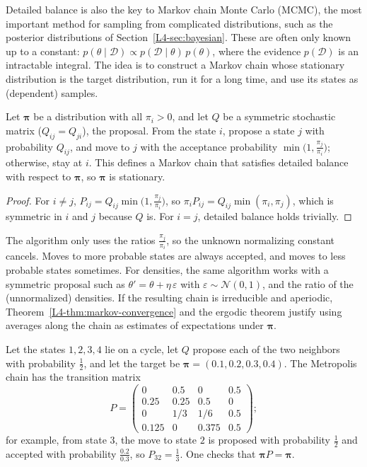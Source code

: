 Detailed balance is also the key to Markov chain Monte Carlo (MCMC), the most important method for sampling from complicated distributions, such as the posterior distributions of Section~\ref{L4-sec:bayesian}. These are often only known up to a constant: $p(\theta \mid \mathcal{D}) \propto p(\mathcal{D} \mid \theta)\,p(\theta)$, where the evidence $p(\mathcal{D})$ is an intractable integral. The idea is to construct a Markov chain whose stationary distribution is the target distribution, run it for a long time, and use its states as (dependent) samples.

\begin{theorem}\label{L4-thm:metropolis}
    Let $\boldsymbol{\pi}$ be a distribution with all $\pi_i > 0$, and let $Q$ be a symmetric stochastic matrix ($Q_{ij} = Q_{ji}$), the proposal. From the state $i$, propose a state $j$ with probability $Q_{ij}$, and move to $j$ with the acceptance probability $\min\big(1, \frac{\pi_j}{\pi_i}\big)$; otherwise, stay at $i$. This defines a Markov chain that satisfies detailed balance with respect to $\boldsymbol{\pi}$, so $\boldsymbol{\pi}$ is stationary.
\end{theorem}

\begin{proof}
    For $i \neq j$, $P_{ij} = Q_{ij}\min\big(1, \frac{\pi_j}{\pi_i}\big)$, so $\pi_i P_{ij} = Q_{ij}\min(\pi_i, \pi_j)$, which is symmetric in $i$ and $j$ because $Q$ is. For $i = j$, detailed balance holds trivially.
\end{proof}

The algorithm only uses the ratios $\frac{\pi_j}{\pi_i}$, so the unknown normalizing constant cancels. Moves to more probable states are always accepted, and moves to less probable states sometimes. For densities, the same algorithm works with a symmetric proposal such as $\theta' = \theta + \eta\,\varepsilon$ with $\varepsilon \sim \mathcal{N}(0, 1)$, and the ratio of the (unnormalized) densities. If the resulting chain is irreducible and aperiodic, Theorem~\ref{L4-thm:markov-convergence} and the ergodic theorem justify using averages along the chain as estimates of expectations under $\boldsymbol{\pi}$.

\begin{example}\label{L4-ex:metropolis}
    Let the states $1, 2, 3, 4$ lie on a cycle, let $Q$ propose each of the two neighbors with probability $\frac{1}{2}$, and let the target be $\boldsymbol{\pi} = (0.1, 0.2, 0.3, 0.4)$. The Metropolis chain has the transition matrix
    \[P = \begin{pmatrix} 0 & 0.5 & 0 & 0.5 \\ 0.25 & 0.25 & 0.5 & 0 \\ 0 & 1/3 & 1/6 & 0.5 \\ 0.125 & 0 & 0.375 & 0.5 \end{pmatrix};\]
    for example, from state $3$, the move to state $2$ is proposed with probability $\frac{1}{2}$ and accepted with probability $\frac{0.2}{0.3}$, so $P_{32} = \frac{1}{3}$. One checks that $\boldsymbol{\pi}P = \boldsymbol{\pi}$.
\end{example}

